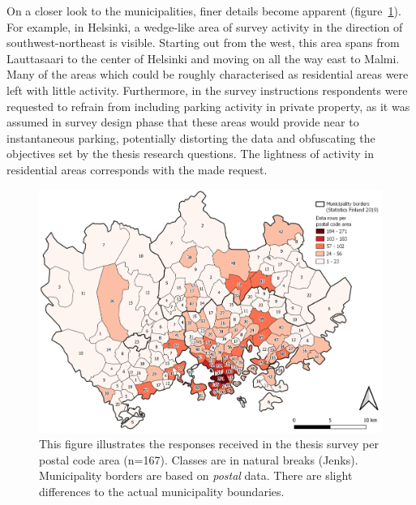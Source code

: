 On a closer look to the municipalities, finer details become apparent (figure~\ref{fig:postalvis_answers}). For example, in Helsinki, a wedge-like area of survey activity in the direction of southwest-northeast is visible. Starting out from the west, this area spans from Lauttasaari to the center of Helsinki and moving on all the way east to Malmi. Many of the areas which could be roughly characterised as residential areas were left with little activity. Furthermore, in the survey instructions respondents were requested to refrain from including parking activity in private property, as it was assumed in survey design phase that these areas would provide near to instantaneous parking, potentially distorting the data and obfuscating the objectives set by the thesis research questions. The lightness of activity in residential areas corresponds with the made request.

\begin{figure}[H]%
    \centering
    \includegraphics[width=\textwidth]{images/thesis_postalvis_answers.png}
    \caption[Data rows received per postal code area]{This figure illustrates the responses received in the thesis survey per postal code area (n=167). Classes are in natural breaks (Jenks). Municipality borders are based on \textit{postal} data. There are slight differences to the actual municipality boundaries.}%
    \label{fig:postalvis_answers}%
\end{figure}


